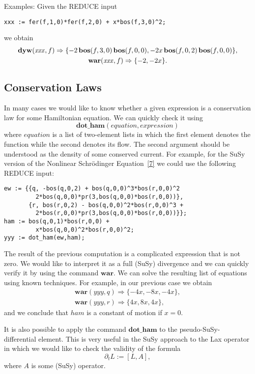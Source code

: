 {Examples: Given the REDUCE input
\begin{verbatim}
xxx := fer(f,1,0)*fer(f,2,0) + x*bos(f,3,0)^2;
\end{verbatim}
we obtain
\begin{gather*}
  \mathbf{dyw}(\mathit{xxx},f) \Rightarrow
  \{ -2\,\mathbf{bos}(f,3,0)\,\mathbf{bos}(f,0,0), -2x\,\mathbf{bos}(f,0,2)\,\mathbf{bos}(f,0,0) \}, \\
  \mathbf{war}(\mathit{xxx},f) \Rightarrow \{ -2, -2x \}.
\end{gather*}

\subsection{Conservation Laws}

In many cases we would like to know whether a given expression is a
conservation law for some Hamiltonian equation.  We can quickly check
it using
\begin{equation*}
  \mathbf{dot\_ham}(\mathit{equation},\mathit{expression})
\end{equation*}
where $\mathit{equation}$ is a list of two-element lists in which the
first element denotes the function while the second denotes its flow.
The second argument should be understood as the density of some
conserved current.  For example, for the SuSy version of the Nonlinear
Schr\"odinger Equation~\hyperlink{susy2-bib}{[7]} we could use the
following REDUCE input:
\begin{verbatim}
ew := {{q, -bos(q,0,2) + bos(q,0,0)^3*bos(r,0,0)^2
         2*bos(q,0,0)*pr(3,bos(q,0,0)*bos(r,0,0))},
       {r, bos(r,0,2) - bos(q,0,0)^2*bos(r,0,0)^3 +
         2*bos(r,0,0)*pr(3,bos(q,0,0)*bos(r,0,0))}};
ham := bos(q,0,1)*bos(r,0,0) +
         x*bos(q,0,0)^2*bos(r,0,0)^2;
yyy := dot_ham(ew,ham);
\end{verbatim}
The result of the previous computation is a complicated expression
that is not zero.  We would like to interpret it as a full (SuSy)
divergence and we can quickly verify it by using the command
$\mathbf{war}$.  We can solve the resulting list of equations using
known techniques.  For example, in our previous case we obtain
\begin{gather*}
  \mathbf{war}(yyy,q) \Rightarrow \{-4x,-8x,-4x\}, \\
  \mathbf{war}(yyy,r) \Rightarrow \{4x,8x,4x\},
\end{gather*}
and we conclude that $\mathit{ham}$ is a constant of motion if $x=0$.

It is also possible to apply the command $\mathbf{dot\_ham}$ to the
pseudo-SuSy-differential element.  This is very useful in the SuSy
approach to the Lax operator in which we would like to check the
validity of the formula
\begin{equation*}
  \partial_{t}L := [ L,A ],
\end{equation*}
where $A$ is some (SuSy) operator.

}
